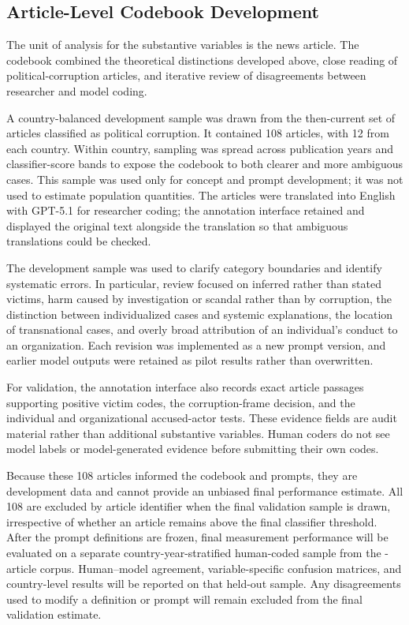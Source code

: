 



\subsection{Article-Level Codebook Development}
\label{sec:method-codebook-development}

The unit of analysis for the substantive variables is the news article. The
codebook combined the theoretical distinctions developed above, close reading
of political-corruption articles, and iterative review of disagreements between
researcher and model coding.

A country-balanced development sample was drawn from the then-current set of
articles classified as political corruption. It contained 108 articles, with
12 from each country. Within country, sampling was spread across publication
years and classifier-score bands to expose the codebook to both clearer and
more ambiguous cases. This sample was used only for concept and prompt
development; it was not used to estimate population quantities. The articles
were translated into English with GPT-5.1 for
researcher coding; the annotation interface retained and displayed the original
text alongside the translation so that ambiguous translations could be
checked.

The development sample was used to clarify category boundaries and identify
systematic errors. In particular, review focused on inferred rather than stated
victims, harm caused by investigation or scandal rather than by corruption,
the distinction between individualized cases and systemic explanations, the
location of transnational cases, and overly broad attribution of an
individual's conduct to an organization. Each revision was implemented as a
new prompt version, and earlier model outputs were retained as pilot results
rather than overwritten.

For validation, the annotation interface also records exact article passages
supporting positive victim codes, the corruption-frame decision, and the
individual and organizational accused-actor tests. These evidence fields are
audit material rather than additional substantive variables. Human coders do
not see model labels or model-generated evidence before submitting their own
codes.

Because these 108 articles informed the codebook and prompts, they are
development data and cannot provide an unbiased final performance estimate.
All 108 are excluded by article identifier when the final validation sample is
drawn, irrespective of whether an article remains above the final classifier
threshold.
After the prompt definitions are frozen, final measurement performance will be
evaluated on a separate country-year-stratified human-coded sample from the
\PCFinalN{}-article corpus. Human--model agreement, variable-specific confusion
matrices, and country-level results will be reported on that held-out sample.
Any disagreements used to modify a definition or prompt will remain excluded
from the final validation estimate.

